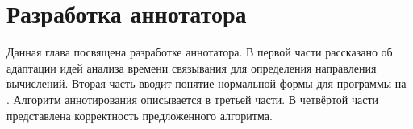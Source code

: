 \section{Разработка аннотатора}
\label{annotator}

Данная глава посвящена разработке аннотатора.
В первой части рассказано об адаптации идей анализа времени связывания для определения направления вычислений.
Вторая часть вводит понятие нормальной формы для программы на \miniKanren{}.
Алгоритм аннотирования описывается в третьей части.
В четвёртой части представлена корректность предложенного алгоритма.








